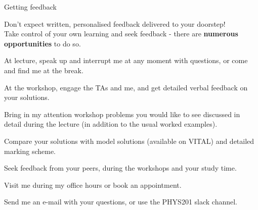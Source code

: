 %
%
%

\begin{frame}{Getting feedback}

Don't expect written, personalised feedback delivered to your doorstep!\\
\vspace{0.3cm}
Take control of your own learning and seek feedback - there are
{\bf numerous opportunities} to do so.
\vspace{0.2cm}
\begin{itemize}
  {\scriptsize
     \item At lecture, speak up and interrupt me at any moment with questions,
           or come and find me at the break.\\
     \item At the workshop, engage the TAs and me, and get detailed verbal
           feedback on your solutions.\\
     \item Bring in my attention workshop problems you would like to
           see discussed in detail during the lecture
           (in addition to the usual worked examples).\\
     \item Compare your solutions with model solutions (available on VITAL)
           and detailed marking scheme.\\
     \item Seek feedback from your peers, during the workshops and your study time.
     \item Visit me during my office hours or book an appointment.
     \item Send me an e-mail with your questions, or use the PHYS201 slack channel.\\
  }
  \end{itemize}

\end{frame}

%
%
%

